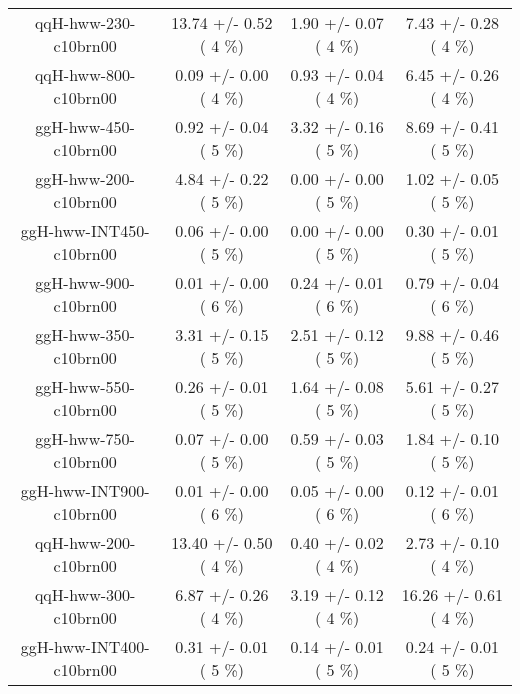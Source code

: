 \begin{table}[h!]
\begin{center}
{\begin{tabular}{
c| c | c | c | }
 qqH-hww-230-c10brn00   &      13.74 +/-       0.52 (         4 \%)   &       1.90 +/-       0.07 (         4 \%)   &       7.43 +/-       0.28 (         4 \%)  \\
 qqH-hww-800-c10brn00   &       0.09 +/-       0.00 (         4 \%)   &       0.93 +/-       0.04 (         4 \%)   &       6.45 +/-       0.26 (         4 \%)  \\
 ggH-hww-450-c10brn00   &       0.92 +/-       0.04 (         5 \%)   &       3.32 +/-       0.16 (         5 \%)   &       8.69 +/-       0.41 (         5 \%)  \\
 ggH-hww-200-c10brn00   &       4.84 +/-       0.22 (         5 \%)   &       0.00 +/-       0.00 (         5 \%)   &       1.02 +/-       0.05 (         5 \%)  \\
 ggH-hww-INT450-c10brn00   &       0.06 +/-       0.00 (         5 \%)   &       0.00 +/-       0.00 (         5 \%)   &       0.30 +/-       0.01 (         5 \%)  \\
 ggH-hww-900-c10brn00   &       0.01 +/-       0.00 (         6 \%)   &       0.24 +/-       0.01 (         6 \%)   &       0.79 +/-       0.04 (         6 \%)  \\
 ggH-hww-350-c10brn00   &       3.31 +/-       0.15 (         5 \%)   &       2.51 +/-       0.12 (         5 \%)   &       9.88 +/-       0.46 (         5 \%)  \\
 ggH-hww-550-c10brn00   &       0.26 +/-       0.01 (         5 \%)   &       1.64 +/-       0.08 (         5 \%)   &       5.61 +/-       0.27 (         5 \%)  \\
 ggH-hww-750-c10brn00   &       0.07 +/-       0.00 (         5 \%)   &       0.59 +/-       0.03 (         5 \%)   &       1.84 +/-       0.10 (         5 \%)  \\
 ggH-hww-INT900-c10brn00   &       0.01 +/-       0.00 (         6 \%)   &       0.05 +/-       0.00 (         6 \%)   &       0.12 +/-       0.01 (         6 \%)  \\
 qqH-hww-200-c10brn00   &      13.40 +/-       0.50 (         4 \%)   &       0.40 +/-       0.02 (         4 \%)   &       2.73 +/-       0.10 (         4 \%)  \\
 qqH-hww-300-c10brn00   &       6.87 +/-       0.26 (         4 \%)   &       3.19 +/-       0.12 (         4 \%)   &      16.26 +/-       0.61 (         4 \%)  \\
 ggH-hww-INT400-c10brn00   &       0.31 +/-       0.01 (         5 \%)   &       0.14 +/-       0.01 (         5 \%)   &       0.24 +/-       0.01 (         5 \%)  \\

\end{tabular}}
\end{center}
\end{table}
